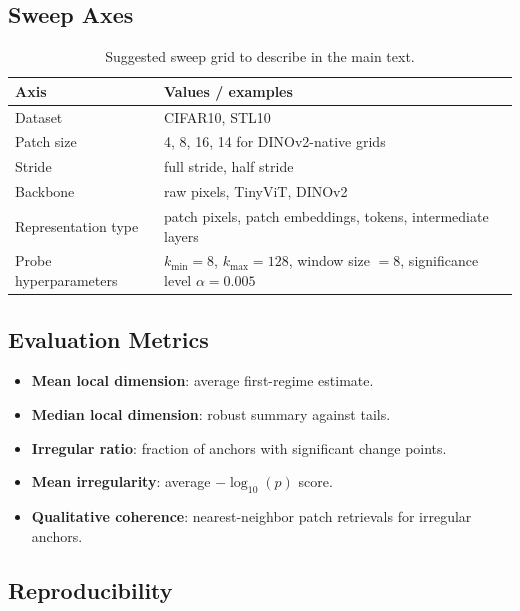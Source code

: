 \documentclass{article}
\theoremstyle{definition}
\theoremstyle{plain}
\theoremstyle{remark}
\begin{document}
\subsection{Sweep Axes}
\begin{table}[H]
\centering
\caption{Suggested sweep grid to describe in the main text.}
\begin{tabular}{ll}
\toprule
Axis & Values / examples \\
\midrule
Dataset & CIFAR10, STL10 \\
Patch size & 4, 8, 16, 14 for DINOv2-native grids \\
Stride & full stride, half stride \\
Backbone & raw pixels, TinyViT, DINOv2 \\
Representation type & patch pixels, patch embeddings, tokens, intermediate layers \\
Probe hyperparameters & $k_{\min}=8$, $k_{\max}=128$, window size $=8$, significance level $\alpha=0.005$ \\
\bottomrule
\end{tabular}
\label{tab:sweep-grid}
\end{table}

\subsection{Evaluation Metrics}
\begin{itemize}[leftmargin=1.5em]
\item \textbf{Mean local dimension}: average first-regime estimate.
\item \textbf{Median local dimension}: robust summary against tails.
\item \textbf{Irregular ratio}: fraction of anchors with significant change points.
\item \textbf{Mean irregularity}: average $-\log_{10}(p)$ score.
\item \textbf{Qualitative coherence}: nearest-neighbor patch retrievals for irregular anchors.
\end{itemize}

\subsection{Reproducibility}
\end{document}
